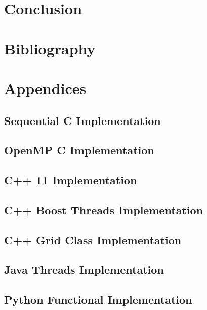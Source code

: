 \documentclass[11pt]{article} %
\begin{document}
\section{Conclusion}
\section{Bibliography}
\nocite{*}


\glsaddall
\printglossaries
\pagebreak
\appendix
\pagebreak
\section{Appendices}
\subsection{Sequential C Implementation}

\pagebreak
\subsection{OpenMP C Implementation}

\pagebreak
\subsection{C++ 11 Implementation}

\pagebreak
\subsection{C++ Boost Threads Implementation}

\pagebreak
\subsection{C++ Grid Class Implementation}

\pagebreak
\subsection{Java Threads Implementation}

\pagebreak
\subsection{Python Functional Implementation}

\pagebreak
\end{document}
